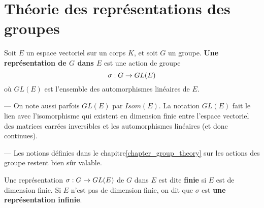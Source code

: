 \chapter{Théorie des représentations des groupes}


\begin{definition}
	Soit $E$ un espace vectoriel sur un corps $K$, et soit $G$ un groupe.
	\textbf{Une représentation de $G$ dans $E$} est une action de groupe
	\begin{equation}
		\sigma : G \rightarrow GL(E)
		\label{definition_representation}
	\end{equation}
	où $GL(E)$ est l'ensemble des automorphismes linéaires de $E$.
\end{definition}

\begin{remarque}
	--- On note aussi parfois $GL(E)$ par $Isom(E)$. La notation $GL(E)$ fait le
	lien avec l'isomorphisme qui existent en dimension finie entre l'espace
	vectoriel des matrices carrées inversibles et les automorphismes linéaires
	(et donc continues).

	--- Les notions définies dans le chapitre\ref{chapter_group_theory} sur les
	actions des groupe restent bien sûr valable.
\end{remarque}

\begin{definition}
	Une représentation $\sigma : G \rightarrow GL(E)$ de $G$ dans $E$ est dite
	\textbf{finie} si $E$ est de dimension finie. Si $E$ n'est pas de dimension
	finie, on dit que $\sigma$ est \textbf{une représentation infinie}.
\end{definition}

